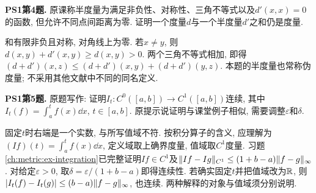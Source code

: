 \begin{exercise}\label{ps190:1:4}
\textbf{PS1第4题.} 原课称半度量为满足非负性、对称性、三角不等式以及$d'(x,x)=0$的函数, 但允许不同点间距离为零. 证明一个度量$d$与一个半度量$d'$之和仍是度量.
\end{exercise}
\begin{solution}
和有限非负且对称, 对角线上为零. 若$x\ne y$, 则$d(x,y)+d'(x,y)\ge d(x,y)>0$. 两个三角不等式相加, 即得$(d+d')(x,z)\le(d+d')(x,y)+(d+d')(y,z)$. 本题的半度量也常称伪度量; 不采用其他文献中不同的同名定义.
\end{solution}

\begin{exercise}\label{ps190:1:5}
\textbf{PS1第5题.} 原题写作: 证明$I_t:C^0([a,b])\to C^1([a,b])$连续, 其中$I_t(f)=\int_a^t f(x)\dd x$, $t\in[a,b]$. 原提示说证明与课堂例子相似, 需要调整$\varepsilon$和$\delta$.
\end{exercise}
\begin{solution}
固定$t$时右端是一个实数, 与所写值域不符. 按积分算子的含义, 应理解为$(If)(t)=\int_a^t f(x)\dd x$, 定义域取上确界度量, 值域取$C^1$度量. 习题\ref{ch:metric:ex-integration}已完整证明$If\in C^1$及$\lVert If-Ig\rVert_{C^1}\le(1+b-a)\lVert f-g\rVert_\infty$. 对给定$\varepsilon>0$, 取$\delta=\varepsilon/(1+b-a)$即得连续性. 若确实固定$t$并把值域改为$\mathbb R$, 则$|I_t(f)-I_t(g)|\le(b-a)\lVert f-g\rVert_\infty$, 也连续. 两种解释的对象与值域须分别说明.
\end{solution}

